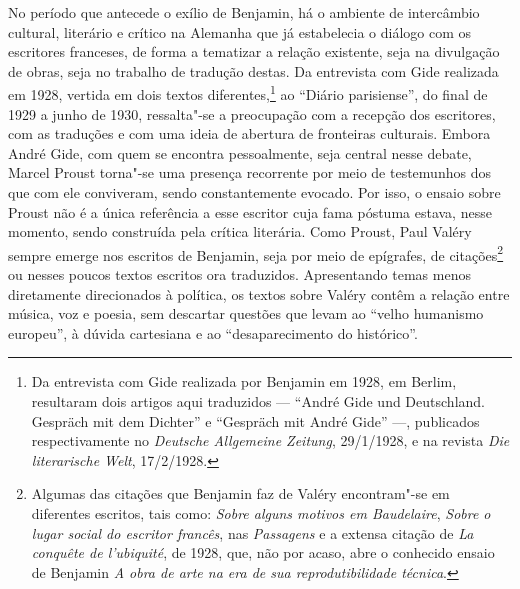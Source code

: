 No período que antecede o exílio de Benjamin, há o ambiente de
intercâmbio cultural, literário e crítico na Alemanha que já estabelecia
o diálogo com os escritores franceses, de forma a tematizar a relação
existente, seja na divulgação de obras, seja no trabalho de tradução
destas. Da entrevista com Gide realizada em 1928, vertida em dois textos
diferentes,\footnote{Da entrevista com Gide realizada por Benjamin em
  1928, em Berlim, resultaram dois artigos aqui traduzidos --- ``André Gide
  und Deutschland. Gespräch mit dem Dichter'' e ``Gespräch mit André
  Gide'' ---, publicados respectivamente no \emph{Deutsche Allgemeine
  Zeitung}, 29/1/1928, e na revista \emph{Die literarische Welt},
  17/2/1928.} ao ``Diário parisiense'', do final de 1929 a junho de 1930, ressalta"-se a preocupação com a recepção dos escritores, com as traduções e com uma
ideia de abertura de fronteiras culturais. Embora André Gide, com quem se encontra
pessoalmente, seja central nesse debate, Marcel Proust torna"-se uma presença
recorrente por meio de testemunhos dos que com ele conviveram, sendo
constantemente evocado. Por isso, o ensaio sobre Proust não é a única
referência a esse escritor cuja fama póstuma estava, nesse momento,
sendo construída pela crítica literária.
Como Proust, Paul Valéry sempre emerge nos escritos de Benjamin, seja
por meio de epígrafes, de citações\footnote{Algumas das citações que Benjamin faz de Valéry encontram"-se em diferentes escritos, tais como: \emph{Sobre alguns motivos em Baudelaire}, \emph{Sobre o lugar social do escritor francês}, nas \emph{Passagens} e a extensa citação de \emph{La conquête de l'ubiquité}, de 1928, que, não por acaso, abre o conhecido ensaio de Benjamin \emph{A obra de arte na era de sua reprodutibilidade técnica}.} ou nesses poucos textos escritos ora
traduzidos. Apresentando temas menos diretamente direcionados à política, os textos sobre Valéry contêm a relação entre música, voz e poesia, sem descartar questões que levam ao ``velho humanismo europeu'', à dúvida cartesiana e ao ``desaparecimento do histórico''.

